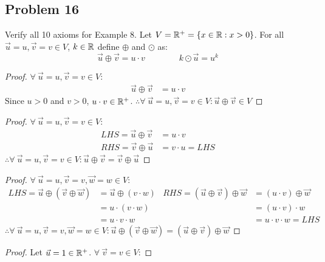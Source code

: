 \subsection*{Problem 16}
Verify all 10 axioms for Example 8. Let $V = \mathbb{R}^+ = \{x \in \mathbb{R}: x>0\}$. For all $\vec{u} = u,\vec{v} = v \in V$, $k\in \mathbb{R}$ define $\oplus$ and $\odot$ as:
\[
  \vec{u} \oplus \vec{v} = u \cdot v\qquad\qquad k \odot \vec{u} = u^k
\]
\begin{enumerate}
  \begin{proof}
    $\forall~\vec{u}=u,\vec{v}=v \in V$:
    \begin{align*}
      \vec{u} \oplus \vec{v} & = u \cdot v
    \end{align*}
    Since $u > 0$ and $v > 0$, $u \cdot v \in \mathbb{R}^+$. $\therefore \forall~\vec{u}=u,\vec{v}=v \in V: \vec{u} \oplus \vec{v} \in V$
  \end{proof}
  \begin{proof}
    $\forall~\vec{u}=u,\vec{v}=v \in V$:
    \begin{align*}
      LHS = \vec{u} \oplus \vec{v} & = u \cdot v       \\
      RHS = \vec{v} \oplus \vec{u} & = v \cdot u = LHS
    \end{align*}
    $\therefore \forall~\vec{u}=u,\vec{v}=v \in V: \vec{u} \oplus \vec{v} = \vec{v} \oplus \vec{u}$
  \end{proof}
  \begin{proof}
    $\forall~\vec{u}=u,\vec{v}=v,\vec{w}=w \in V$:
    \begin{align*}
      LHS = \vec{u} \oplus (\vec{v} \oplus \vec{w}) & = \vec{u} \oplus (v \cdot w) & RHS = (\vec{u} \oplus \vec{v}) \oplus \vec{w} & = (u \cdot v) \oplus \vec{w} \\
                                                    & = u \cdot (v \cdot w)        &                                               & = (u \cdot v) \cdot w        \\
                                                    & = u \cdot v \cdot w          &                                               & = u \cdot v \cdot w = LHS
    \end{align*}
    $\therefore \forall~\vec{u}=u,\vec{v}=v,\vec{w}=w \in V: \vec{u} \oplus (\vec{v} \oplus \vec{w}) = (\vec{u} \oplus \vec{v}) \oplus \vec{w}$
  \end{proof}
  \begin{proof}
    Let $\vec{u} = 1 \in \mathbb{R}^+$. $\forall~\vec{v} = v \in V$:

\end{proof}
\end{enumerate}
